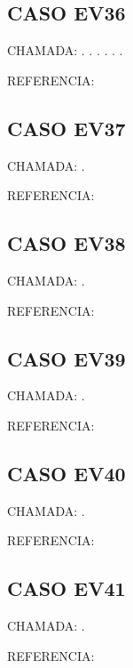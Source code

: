 \documentclass{undftex}
\begin{document}
\begin{refsection}\section*{CASO EV36} CHAMADA: . \textcite{ev10}. . . . . \textcite{ev10}\par REFERENCIA:\par\printbibliography[heading=none,check=undfconsultadas]\end{refsection}\clearpage
\begin{refsection}\section*{CASO EV37} CHAMADA: . \textcite{ev37}\par REFERENCIA:\par\printbibliography[heading=none,check=undfconsultadas]\end{refsection}\clearpage
\begin{refsection}\section*{CASO EV38} CHAMADA: . \textcite{ev38}\par REFERENCIA:\par\printbibliography[heading=none,check=undfconsultadas]\end{refsection}\clearpage
\begin{refsection}\section*{CASO EV39} CHAMADA: . \textcite{ev39z}\par REFERENCIA:\par\printbibliography[heading=none,check=undfconsultadas]\end{refsection}\clearpage
\begin{refsection}\section*{CASO EV40} CHAMADA: . \textcite{ev21a}\par REFERENCIA:\par\printbibliography[heading=none,check=undfconsultadas]\end{refsection}\clearpage
\begin{refsection}\section*{CASO EV41} CHAMADA: . \textcite{ev41}\par REFERENCIA:\par\printbibliography[heading=none,check=undfconsultadas]\end{refsection}\clearpage
\end{document}
